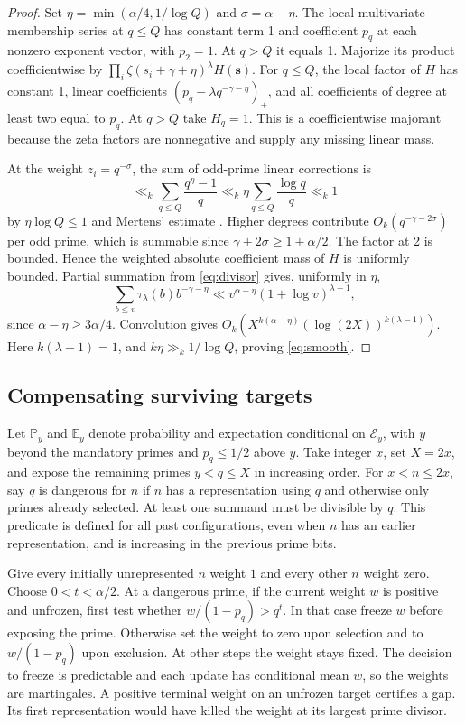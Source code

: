 \documentclass[11pt]{article}
\newcommand{\E}{\mathbb E}
\newcommand{\PP}{\mathbb P}
\begin{document}
\begin{proof}
Set \(\eta=\min(\alpha/4,1/\log Q)\) and \(\sigma=\alpha-\eta\).
The local multivariate membership series at \(q\le Q\) has
constant term 1 and coefficient \(p_q\) at each nonzero
exponent vector, with \(p_2=1\). At \(q>Q\) it equals 1.
Majorize its product coefficientwise by
\(\prod_i\zeta(s_i+\gamma+\eta)^\lambda H(\mathbf s)\).
For \(q\le Q\), the local factor of \(H\) has constant 1,
linear coefficients \((p_q-\lambda q^{-\gamma-\eta})_+\),
and all coefficients of degree at least two equal to \(p_q\).
At \(q>Q\) take \(H_q=1\).
This is a coefficientwise majorant because the zeta factors
are nonnegative and supply any missing linear mass.

At the weight \(z_i=q^{-\sigma}\), the sum of odd-prime
linear corrections is
\[
 \ll_k\sum_{q\le Q}\frac{q^\eta-1}{q}
 \ll_k\eta\sum_{q\le Q}\frac{\log q}{q}\ll_k1
\]
by \(\eta\log Q\le1\) and Mertens' estimate \cite{RS}.
Higher degrees contribute \(O_k(q^{-\gamma-2\sigma})\) per
odd prime, which is summable since
\(\gamma+2\sigma\ge1+\alpha/2\). The factor at 2 is bounded.
Hence the weighted absolute coefficient mass of \(H\) is
uniformly bounded. Partial summation from \eqref{eq:divisor}
gives, uniformly in \(\eta\),
\[
 \sum_{b\le v}\tau_\lambda(b)b^{-\gamma-\eta}
            \ll v^{\alpha-\eta}(1+\log v)^{\lambda-1},
\]
since \(\alpha-\eta\ge3\alpha/4\).
Convolution gives \(O_k(X^{k(\alpha-\eta)}(\log(2X))^{k(\lambda-1)})\).
Here \(k(\lambda-1)=1\), and \(k\eta\gg_k1/\log Q\), proving
\eqref{eq:smooth}.
\end{proof}

\subsection{Compensating surviving targets}

Let \(\PP_y\) and \(\E_y\) denote probability and expectation
conditional on \(\mathcal E_y\), with \(y\) beyond the mandatory
primes and \(p_q\le1/2\) above \(y\).
Take integer \(x\), set \(X=2x\), and expose the remaining
primes \(y<q\le X\) in increasing order.
For \(x<n\le2x\), say \(q\) is dangerous for \(n\) if \(n\)
has a representation using \(q\) and otherwise only primes
already selected. At least one summand must be divisible by
\(q\). This predicate is defined for all past configurations,
even when \(n\) has an earlier representation, and is increasing
in the previous prime bits.

Give every initially unrepresented \(n\) weight \(1\) and every
other \(n\) weight zero. Choose \(0<t<\alpha/2\).
At a dangerous prime, if the current weight \(w\) is positive and
unfrozen, first test whether \(w/(1-p_q)>q^t\).
In that case freeze \(w\) before exposing the prime. Otherwise
set the weight to zero upon selection and to \(w/(1-p_q)\)
upon exclusion. At other steps the weight stays fixed.
The decision to freeze is predictable and each update has
conditional mean \(w\), so the weights are martingales.
A positive terminal weight on an unfrozen target certifies a
gap. Its first representation would have killed the weight at
its largest prime divisor.
\end{document}

